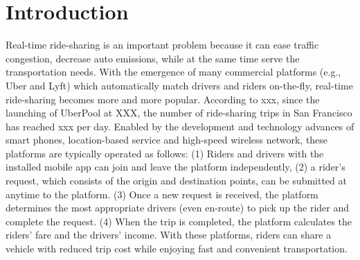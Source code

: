 \section{Introduction}

%	
%	
%	
%	
%	


Real-time ride-sharing is an important problem because it can ease traffic congestion, decrease auto emissions, while at the same time serve the transportation needs. With the emergence of many commercial platforms (e.g., Uber and Lyft) which automatically match drivers and riders on-the-fly, real-time ride-sharing becomes more and more popular. According to xxx, since the launching of UberPool at XXX, the number of ride-sharing trips in San Francisco has reached xxx per day. Enabled by the development and technology advances of smart phones, location-based service and high-speed wireless network, these platforms are typically operated as follows: (1) Riders and drivers with the installed mobile app can join and leave the platform independently, (2) a rider's request, which consists of the origin and destination points, can be submitted at anytime to the platform. (3) Once a new request is received, the platform determines the most appropriate drivers (even en-route) to pick up the rider and complete the request. (4) When the trip is completed, the platform calculates the riders' fare and the drivers' income. With these platforms, riders can share a vehicle with reduced trip cost while enjoying fast and convenient transportation.

